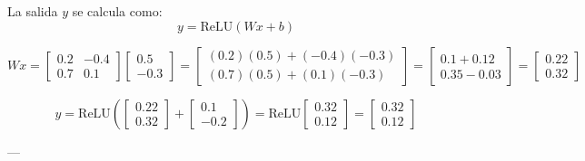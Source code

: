 \documentclass[11pt]{article} %
\begin{document}
La salida \(y\) se calcula como:
\[
y = \text{ReLU}(Wx + b)
\]

\[
Wx = \begin{bmatrix}
0.2 & -0.4 \\
0.7 & 0.1 
\end{bmatrix}
\begin{bmatrix}
0.5 \\
-0.3
\end{bmatrix}
= \begin{bmatrix}
(0.2)(0.5) + (-0.4)(-0.3) \\
(0.7)(0.5) + (0.1)(-0.3)
\end{bmatrix}
= \begin{bmatrix}
0.1 + 0.12 \\
0.35 - 0.03
\end{bmatrix}
= \begin{bmatrix}
0.22 \\
0.32
\end{bmatrix}
\]

\[
y = \text{ReLU}\left(
\begin{bmatrix}
0.22 \\
0.32
\end{bmatrix} + 
\begin{bmatrix}
0.1 \\
-0.2
\end{bmatrix}
\right)
= \text{ReLU}
\begin{bmatrix}
0.32 \\
0.12
\end{bmatrix}
= \begin{bmatrix}
0.32 \\
0.12
\end{bmatrix}
\]

---
\end{document}
